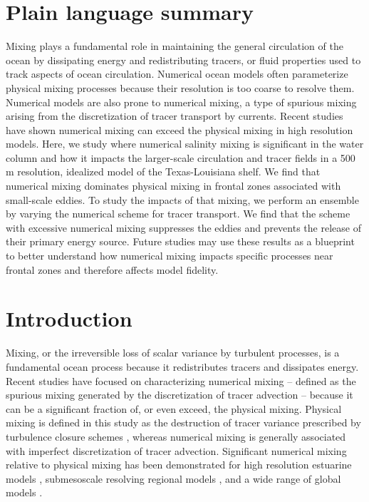 \section{Plain language summary}
Mixing plays a fundamental role in maintaining the general circulation of the ocean by dissipating energy and redistributing tracers, or fluid properties used to track aspects of ocean circulation. Numerical ocean models often parameterize physical mixing processes because their resolution is too coarse to resolve them. Numerical models are also prone to numerical mixing, a type of spurious mixing arising from the discretization of tracer transport by currents. Recent studies have shown numerical mixing can exceed the physical mixing in high resolution models. Here, we study where numerical salinity mixing is significant in the water column and how it impacts the larger-scale circulation and tracer fields in a 500 m resolution, idealized model of the Texas-Louisiana shelf. We find that numerical mixing dominates physical mixing in frontal zones associated with small-scale eddies. To study the impacts of that mixing, we perform an ensemble by varying the numerical scheme for tracer transport. We find that the scheme with excessive numerical mixing suppresses the eddies and prevents the release of their primary energy source. Future studies may use these results as a blueprint to better understand how numerical mixing impacts specific processes near frontal zones and therefore affects model fidelity. 

\section{Introduction} \label{sec:intro}
Mixing, or the irreversible loss of scalar variance by turbulent processes, is a fundamental ocean process because it redistributes tracers and dissipates energy. Recent studies have focused on characterizing numerical mixing -- defined as the spurious mixing generated by the discretization of tracer advection -- because it can be a significant fraction of, or even exceed, the physical mixing. Physical mixing is defined in this study as the destruction of tracer variance prescribed by turbulence closure schemes \citep{Burchard_2008, MacCready_2018}, whereas numerical mixing is generally associated with imperfect discretization of tracer advection. Significant numerical mixing relative to physical mixing has been demonstrated for high resolution estuarine models \citep{Ralston_2017, Rennau_2009, Wang_2021}, submesoscale resolving regional models \citep{Schlichting23}, and a wide range of global models \citep{Griffies_2000, Holmes_2021, Ilicak_2012, megann2018estimating}.

